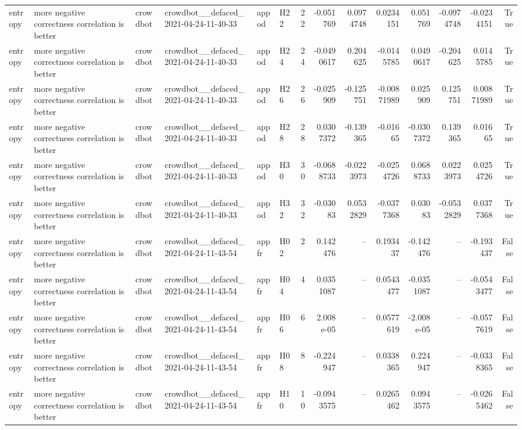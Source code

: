 \begin{longtable}{llllllrrrrrrrr}
entropy & more negative correctness correlation is better & crowdbot & crowdbot\_\_defaced\_2021-04-24-11-40-33 & appod & H22 & 22 & -0.051769 & 0.0974748 & 0.0234151 & 0.051769 & -0.0974748 & -0.0234151 & True \\
entropy & more negative correctness correlation is better & crowdbot & crowdbot\_\_defaced\_2021-04-24-11-40-33 & appod & H24 & 24 & -0.0490617 & 0.204625 & -0.0145785 & 0.0490617 & -0.204625 & 0.0145785 & True \\
entropy & more negative correctness correlation is better & crowdbot & crowdbot\_\_defaced\_2021-04-24-11-40-33 & appod & H26 & 26 & -0.025909 & -0.125751 & -0.00871989 & 0.025909 & 0.125751 & 0.00871989 & True \\
entropy & more negative correctness correlation is better & crowdbot & crowdbot\_\_defaced\_2021-04-24-11-40-33 & appod & H28 & 28 & 0.0307372 & -0.139365 & -0.01665 & -0.0307372 & 0.139365 & 0.01665 & True \\
entropy & more negative correctness correlation is better & crowdbot & crowdbot\_\_defaced\_2021-04-24-11-40-33 & appod & H30 & 30 & -0.0688733 & -0.0223973 & -0.0254726 & 0.0688733 & 0.0223973 & 0.0254726 & True \\
entropy & more negative correctness correlation is better & crowdbot & crowdbot\_\_defaced\_2021-04-24-11-40-33 & appod & H32 & 32 & -0.03083 & 0.0532829 & -0.0377368 & 0.03083 & -0.0532829 & 0.0377368 & True \\
entropy & more negative correctness correlation is better & crowdbot & crowdbot\_\_defaced\_2021-04-24-11-43-54 & appfr & H02 & 2 & 0.142476 & -- & 0.193437 & -0.142476 & -- & -0.193437 & False \\
entropy & more negative correctness correlation is better & crowdbot & crowdbot\_\_defaced\_2021-04-24-11-43-54 & appfr & H04 & 4 & 0.0351087 & -- & 0.0543477 & -0.0351087 & -- & -0.0543477 & False \\
entropy & more negative correctness correlation is better & crowdbot & crowdbot\_\_defaced\_2021-04-24-11-43-54 & appfr & H06 & 6 & 2.008e-05 & -- & 0.0577619 & -2.008e-05 & -- & -0.0577619 & False \\
entropy & more negative correctness correlation is better & crowdbot & crowdbot\_\_defaced\_2021-04-24-11-43-54 & appfr & H08 & 8 & -0.224947 & -- & 0.0338365 & 0.224947 & -- & -0.0338365 & False \\
entropy & more negative correctness correlation is better & crowdbot & crowdbot\_\_defaced\_2021-04-24-11-43-54 & appfr & H10 & 10 & -0.0943575 & -- & 0.0265462 & 0.0943575 & -- & -0.0265462 & False \\

\end{longtable}
